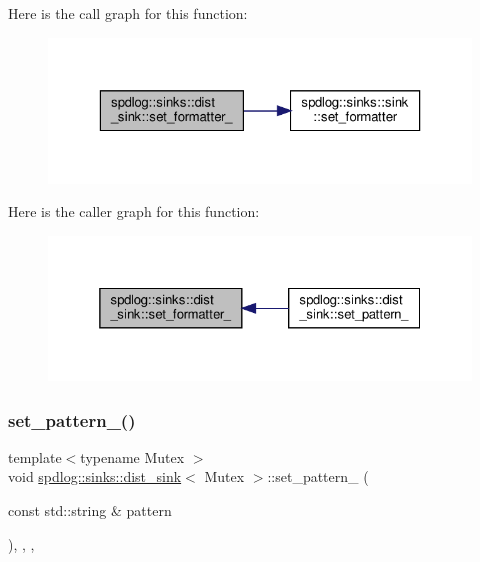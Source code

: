 Here is the call graph for this function\+:
\nopagebreak
\begin{figure}[H]
\begin{center}
\leavevmode
\includegraphics[width=323pt]{classspdlog_1_1sinks_1_1dist__sink_a5e83e285fcceaab7ee4c4736c2decef0_cgraph}
\end{center}
\end{figure}
Here is the caller graph for this function\+:
\nopagebreak
\begin{figure}[H]
\begin{center}
\leavevmode
\includegraphics[width=325pt]{classspdlog_1_1sinks_1_1dist__sink_a5e83e285fcceaab7ee4c4736c2decef0_icgraph}
\end{center}
\end{figure}
\mbox{\label{classspdlog_1_1sinks_1_1dist__sink_a6f77a1e2f45ed85ee8ed554cf7442d4e}} 
\subsubsection{\texorpdfstring{set\+\_\+pattern\+\_\+()}{set\_pattern\_()}}
{\footnotesize\ttfamily template$<$typename Mutex $>$ \\
void \hyperlink{classspdlog_1_1sinks_1_1dist__sink}{spdlog\+::sinks\+::dist\+\_\+sink}$<$ Mutex $>$\+::set\+\_\+pattern\+\_\+ (\begin{DoxyParamCaption}\item[{const std\+::string \&}]{pattern }\end{DoxyParamCaption})\hspace{0.3cm}{\ttfamily [inline]}, {\ttfamily [override]}, {\ttfamily [protected]}, {\ttfamily [virtual]}}



